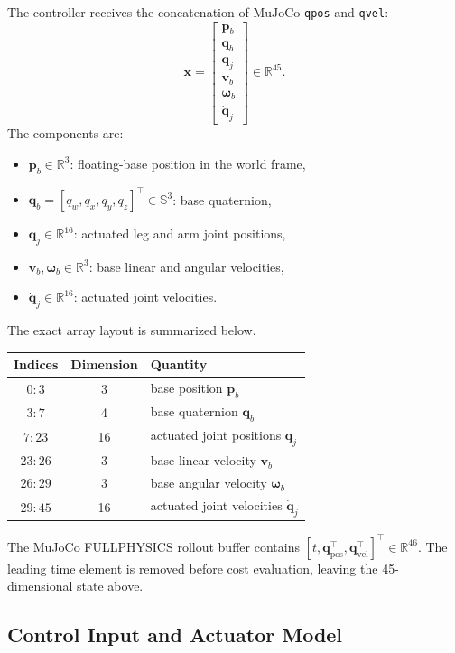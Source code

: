 \documentclass[11pt,a4paper]{article}
\newcommand{\R}{\mathbb{R}}
\newcommand{\code}[1]{\texttt{#1}}
\begin{document}
The controller receives the concatenation of MuJoCo \code{qpos} and
\code{qvel}:
\begin{equation}
  \boxed{
  \bm{x}=
  \begin{bmatrix}
    \bm{p}_b\\
    \bm{q}_b\\
    \bm{q}_j\\
    \bm{v}_b\\
    \bm{\omega}_b\\
    \dot{\bm{q}}_j
  \end{bmatrix}
  \in\R^{45}.}
\end{equation}
The components are:
\begin{itemize}
  \item $\bm{p}_b\in\R^3$: floating-base position in the world frame,
  \item $\bm{q}_b=[q_w,q_x,q_y,q_z]^\top\in\mathbb{S}^3$: base quaternion,
  \item $\bm{q}_j\in\R^{16}$: actuated leg and arm joint positions,
  \item $\bm{v}_b,\bm{\omega}_b\in\R^3$: base linear and angular velocities,
  \item $\dot{\bm{q}}_j\in\R^{16}$: actuated joint velocities.
\end{itemize}

The exact array layout is summarized below.
\begin{center}
\begin{tabular}{ccl}
\toprule
Indices & Dimension & Quantity\\
\midrule
$0{:}3$ & 3 & base position $\bm{p}_b$\\
$3{:}7$ & 4 & base quaternion $\bm{q}_b$\\
$7{:}23$ & 16 & actuated joint positions $\bm{q}_j$\\
$23{:}26$ & 3 & base linear velocity $\bm{v}_b$\\
$26{:}29$ & 3 & base angular velocity $\bm{\omega}_b$\\
$29{:}45$ & 16 & actuated joint velocities $\dot{\bm{q}}_j$\\
\bottomrule
\end{tabular}
\end{center}

The MuJoCo FULLPHYSICS rollout buffer contains
$[t,\bm{q}_{\mathrm{pos}}^\top,\bm{q}_{\mathrm{vel}}^\top]^\top\in\R^{46}$.
The leading time element is removed before cost evaluation, leaving the
45-dimensional state above.

\subsection{Control Input and Actuator Model}
\end{document}
